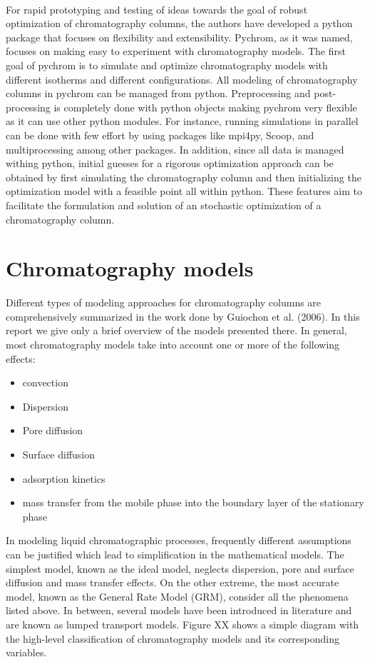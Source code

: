 \documentclass[paper=a4, fontsize=11pt]{scrartcl}
\begin{document}
\\
For rapid prototyping and testing of ideas towards the goal of robust optimization of chromatography columns, the authors have developed a python package that focuses on flexibility and extensibility. Pychrom, as it was named, focuses on making easy to experiment with chromatography models. The first goal of pychrom is to simulate and optimize chromatography models with different isotherms and different configurations. All modeling of chromatography columns in pychrom can be managed from python. Preprocessing and post-processing is completely done with python objects making pychrom very flexible as it can use other python modules. For instance, running simulations in parallel can be done with few effort by using packages like mpi4py, Scoop, and multiprocessing among other packages. In addition, since all data is managed withing python, initial guesses for a rigorous optimization approach can be obtained by first simulating the chromatography column and then initializing the optimization model with a feasible point all within python. These features aim to facilitate the formulation and solution of an stochastic optimization of a chromatography column. 
 

\section{Chromatography models}

Different types of modeling approaches for chromatography columns are comprehensively summarized in the work done by Guiochon et al. (2006). In this report we give only a brief overview of the models presented there.
In general, most chromatography models take into account one or
more of the following effects:

\begin{itemize}
\item convection
\item Dispersion
\item Pore diffusion
\item Surface diffusion
\item adsorption kinetics
\item mass transfer from the mobile phase into the boundary layer of the stationary phase
\end{itemize}

In modeling liquid chromatographic processes, frequently different assumptions can be justified which lead to simplification in the mathematical models. The simplest model, known as the ideal model, neglects dispersion, pore and surface diffusion and mass transfer effects. On the other extreme, the most accurate model, known as the General Rate Model (GRM), consider all the phenomena listed above. In between, several models have been introduced in literature and are known as lumped transport models. Figure XX shows a simple diagram with the high-level classification of chromatography models and its corresponding variables.
\end{document}
